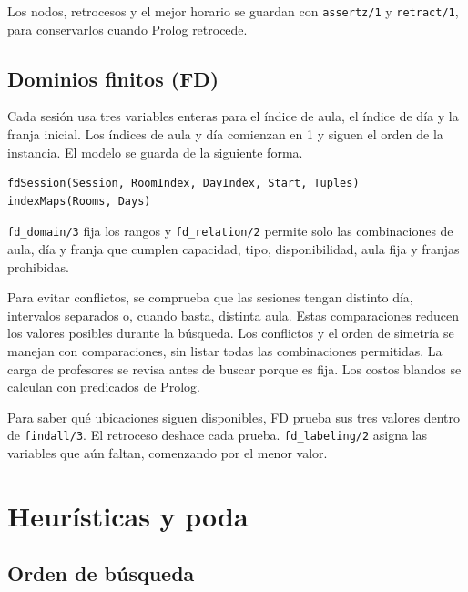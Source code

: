 \documentclass[11pt]{article}
\begin{document}
Los nodos, retrocesos y el mejor horario se guardan con \texttt{assertz/1} y \texttt{retract/1}, para conservarlos cuando Prolog retrocede.

\subsection{Dominios finitos (FD)}

Cada sesión usa tres variables enteras para el índice de aula, el índice de día y la franja inicial. Los índices de aula y día comienzan en 1 y siguen el orden de la instancia. El modelo se guarda de la siguiente forma.
\begin{lstlisting}
fdSession(Session, RoomIndex, DayIndex, Start, Tuples)
indexMaps(Rooms, Days)
\end{lstlisting}
\texttt{fd\_domain/3} fija los rangos y \texttt{fd\_relation/2} permite solo las combinaciones de aula, día y franja que cumplen capacidad, tipo, disponibilidad, aula fija y franjas prohibidas.

Para evitar conflictos, se comprueba que las sesiones tengan distinto día, intervalos separados o, cuando basta, distinta aula. Estas comparaciones reducen los valores posibles durante la búsqueda. Los conflictos y el orden de simetría se manejan con comparaciones, sin listar todas las combinaciones permitidas. La carga de profesores se revisa antes de buscar porque es fija. Los costos blandos se calculan con predicados de Prolog.

Para saber qué ubicaciones siguen disponibles, FD prueba sus tres valores dentro de \texttt{findall/3}. El retroceso deshace cada prueba. \texttt{fd\_labeling/2} asigna las variables que aún faltan, comenzando por el menor valor.

\section{Heurísticas y poda}

\subsection{Orden de búsqueda}
\end{document}
